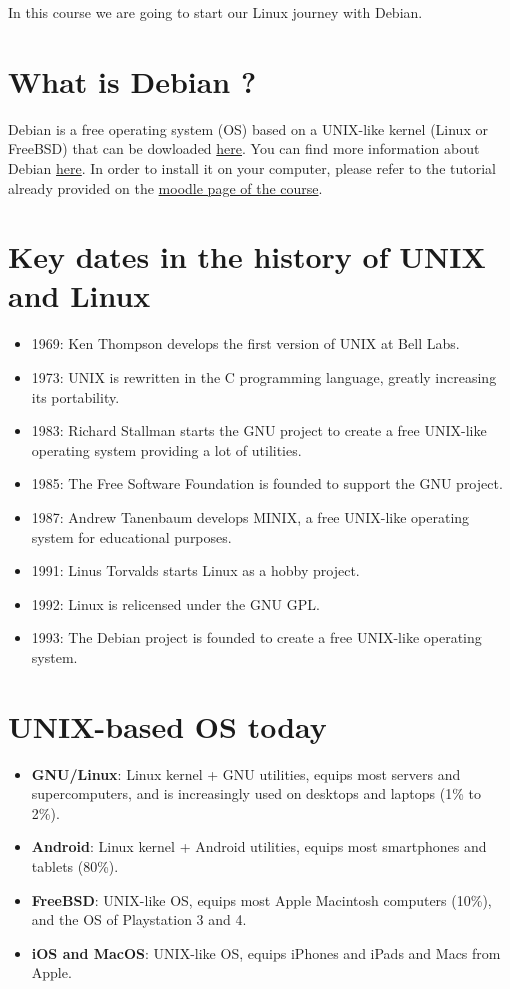 \documentclass[11pt]{article}
\begin{document}
In this course we are going to start our Linux journey with Debian.

\section{What is Debian ?}

Debian is a free operating system (OS) based on a UNIX-like kernel (Linux or FreeBSD) that can be dowloaded \href{https://www.debian.org/download}{here}. You can find more information about Debian \href{https://www.debian.org/intro/about}{here}. In order to install it on your computer, please refer to the tutorial already provided on the \href{https://moodle.myefrei.fr/course/view.php?id=11798}{moodle page of the course}.

\section{Key dates in the history of UNIX and Linux}

\begin{itemize}
\item 1969: Ken Thompson develops the first version of UNIX at Bell Labs.
\item 1973: UNIX is rewritten in the C programming language, greatly increasing its portability.
\item 1983: Richard Stallman starts the GNU project to create a free UNIX-like operating system providing a lot of utilities.
\item 1985: The Free Software Foundation is founded to support the GNU project.
\item 1987: Andrew Tanenbaum develops MINIX, a free UNIX-like operating system for educational purposes.
\item 1991: Linus Torvalds starts Linux as a hobby project.
\item 1992: Linux is relicensed under the GNU GPL.
\item 1993: The Debian project is founded to create a free UNIX-like operating system.
\end{itemize}

\section{UNIX-based OS today}

\begin{itemize}
  \item{\bf{GNU/Linux}}: Linux kernel + GNU utilities, equips most servers and supercomputers, and is increasingly used on desktops and laptops (1\% to 2\%).
  \item{\bf Android}: Linux kernel + Android utilities, equips most smartphones and tablets (80\%).
  \item{\bf FreeBSD}: UNIX-like OS, equips most Apple Macintosh computers (10\%), and the OS of Playstation 3 and 4.
  \item{\bf iOS and MacOS}: UNIX-like OS, equips iPhones and iPads and Macs from Apple.
\end{itemize}
\end{document}
